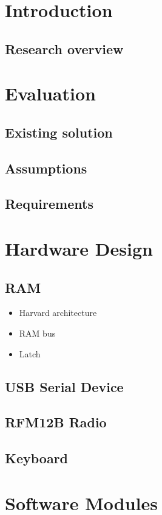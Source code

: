 \chapter{Introduction}

\section{Research overview}

\chapter{Evaluation}
\section{Existing solution}
\section{Assumptions}
\section{Requirements}

\chapter{Hardware Design}
\section{RAM}
\begin{itemize}
\item Harvard architecture
\item RAM bus
\item Latch
\end{itemize}
\section{USB Serial Device}
\section{RFM12B Radio}
\section{Keyboard}

\chapter{Software Modules}
